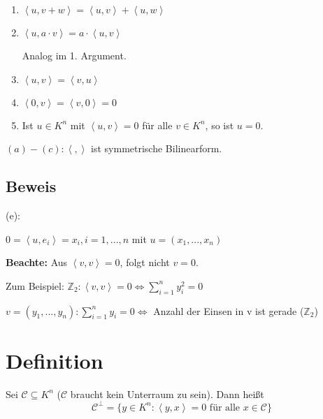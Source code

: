 \documentclass[a4paper, openany]{book}
\begin{document}
\begin{enumerate}[label=(\alph*)]
	\item $\left \langle u, v+w \right \rangle = \left \langle u,v  \right \rangle + \left \langle u,w \right \rangle$

	\item $\left \langle u, a \cdot v \right \rangle = a \cdot \left \langle u,v \right \rangle$

	Analog im 1. Argument.

	\item $\left \langle u, v \right \rangle = \left \langle v, u \right \rangle$

	\item $\left \langle 0, v\right \rangle = \left \langle v, 0 \right \rangle = 0$

	\item Ist $u \in K^n$ mit $\left \langle u, v \right \rangle = 0$ für alle $v \in K^n$, so ist $u = 0$.
\end{enumerate}

$(a)-(c): \left \langle , \right \rangle$ ist symmetrische Bilinearform.

\subsection{Beweis}

(e):

$0 = \left \langle u, e_i \right \rangle = x_i, i=1, ..., n$ mit $u = (x_1, ..., x_n)$

\par \medskip

\textbf{Beachte:} Aus $\left \langle v, v \right \rangle = 0$, folgt nicht $v = 0$.

\par \medskip

Zum Beispiel: $\mathbb{Z}_2: \left \langle v, v \right \rangle = 0 \Leftrightarrow \sum_{i=1}^n y_i^2 = 0$

\par \medskip

$v = (y_1, ..., y_n) : \sum_{i=1}^n y_i = 0 \Leftrightarrow$ Anzahl der Einsen in v ist gerade ($\mathbb{Z}_2$)


\section{Definition}

Sei $\mathcal{C} \subseteq K^n$ ($\mathcal{C}$ braucht kein Unterraum zu sein). Dann heißt \[ \mathcal{C}^{\perp} = \{y \in K^n : \left \langle y,x \right \rangle = 0 \text{ für alle $x \in \mathcal{C}$} \} \]
\end{document}
